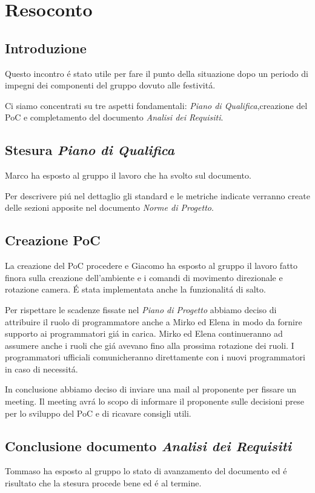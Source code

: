 \section{Resoconto}
\subsection{Introduzione}
Questo incontro é stato utile per fare il punto della situazione dopo un periodo di impegni
dei componenti del gruppo dovuto alle festivitá.

Ci siamo concentrati su tre aspetti fondamentali: \textit{Piano di Qualifica},creazione del PoC e completamento 
del documento \textit{Analisi dei Requisiti}.
\subsection{Stesura \textit{Piano di Qualifica}}
Marco ha esposto al gruppo il lavoro che ha svolto sul documento.

Per descrivere piú nel dettaglio gli standard e le metriche indicate verranno create
delle sezioni apposite nel documento \textit{Norme di Progetto}.
\subsection{Creazione PoC}
La creazione del PoC procedere e Giacomo ha esposto al gruppo il lavoro
fatto finora sulla creazione dell'ambiente e i comandi di movimento direzionale e rotazione camera.
É stata implementata anche la funzionalitá di salto.

Per rispettare le scadenze fissate nel \textit{Piano di Progetto} abbiamo deciso di attribuire il ruolo di programmatore anche a Mirko ed Elena 
in modo da fornire supporto ai programmatori giá in carica.
Mirko ed Elena continueranno ad assumere anche i ruoli che giá avevano fino alla prossima rotazione dei ruoli.
I programmatori ufficiali comunicheranno direttamente con i nuovi programmatori in caso di necessitá.

In conclusione abbiamo deciso di inviare una mail al proponente per fissare un meeting.
Il meeting avrá lo scopo di informare il proponente sulle decisioni prese per lo sviluppo del PoC e 
di ricavare consigli utili. 
\subsection{Conclusione documento \textit{Analisi dei Requisiti}}
Tommaso ha esposto al gruppo lo stato di avanzamento del documento ed é risultato che la stesura procede bene ed
é al termine.
